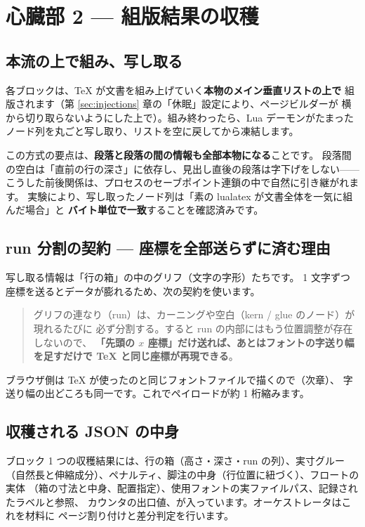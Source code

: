 \documentclass[11pt,a4paper]{ltjsarticle}
\begin{document}
\section{心臓部 2 --- 組版結果の収穫}
\label{sec:harvest}

\subsection{本流の上で組み、写し取る}

各ブロックは、TeX が文書を組み上げていく\textbf{本物のメイン垂直リストの上で}
組版されます（第 \ref{sec:injections} 章の「休眠」設定により、ページビルダーが
横から切り取らないようにした上で）。組み終わったら、Lua デーモンがたまった
ノード列を丸ごと写し取り、リストを空に戻してから凍結します。

この方式の要点は、\textbf{段落と段落の間の情報も全部本物になる}ことです。
段落間の空白は「直前の行の深さ」に依存し、見出し直後の段落は字下げをしない——
こうした前後関係は、プロセスのセーブポイント連鎖の中で自然に引き継がれます。
実験により、写し取ったノード列は「素の lualatex が文書全体を一気に組んだ場合」と
\textbf{バイト単位で一致}することを確認済みです。

\subsection{run 分割の契約 --- 座標を全部送らずに済む理由}

写し取る情報は「行の箱」の中のグリフ（文字の字形）たちです。
1 文字ずつ座標を送るとデータが膨れるため、次の契約を使います。

\begin{quote}
グリフの連なり（run）は、カーニングや空白（kern / glue のノード）が現れるたびに
必ず分割する。すると run の内部にはもう位置調整が存在しないので、
\textbf{「先頭の $x$ 座標」だけ送れば、あとはフォントの字送り幅を足すだけで
TeX と同じ座標が再現できる}。
\end{quote}

ブラウザ側は TeX が使ったのと同じフォントファイルで描くので（次章）、
字送り幅の出どころも同一です。これでペイロードが約 1 桁縮みます。

\subsection{収穫される JSON の中身}

ブロック 1 つの収穫結果には、行の箱（高さ・深さ・run の列）、実寸グルー
（自然長と伸縮成分）、ペナルティ、脚注の中身（行位置に紐づく）、フロートの実体
（箱の寸法と中身、配置指定）、使用フォントの実ファイルパス、記録されたラベルと参照、
カウンタの出口値、が入っています。オーケストレータはこれを材料に
ページ割り付けと差分判定を行います。
\end{document}

